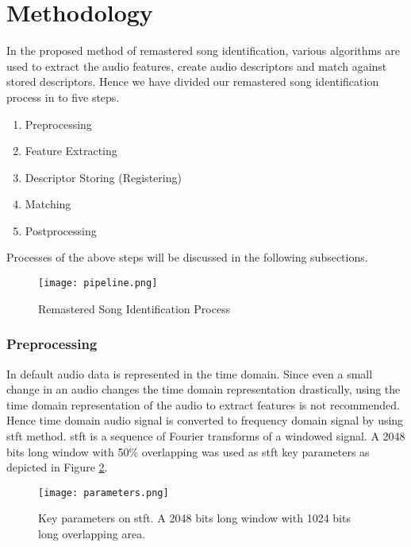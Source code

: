 \section{Methodology}

In the proposed method of remastered song identification, various algorithms are used to
extract the audio features, create audio descriptors and match against stored descriptors.
Hence we have divided our remastered song identification process in to five steps.

\begin{enumerate}
    \item Preprocessing
    \item Feature Extracting
    \item Descriptor Storing (Registering)
    \item Matching
    \item Postprocessing
  \end{enumerate}

Processes of the above steps will be discussed in the following subsections.

\begin{figure}[H]
    \centering
    \texttt{[image: pipeline.png]}
    \caption{Remastered Song Identification Process}
    \label{fig:pipeline}
\end{figure}


\subsubsection{Preprocessing}

In default audio data is represented in the time domain. Since even a small change in an audio changes the time domain representation drastically,
using the time domain representation of the audio to extract features is not recommended. Hence time domain audio signal is converted to
frequency domain signal by using \ac{stft} method. \ac{stft} is a sequence of Fourier transforms of a windowed signal\cite{Kehtarnavaz2008}.
A 2048 bits long window with 50\% overlapping was used as \ac{stft} key parameters as depicted in Figure \ref{fig:parameters}.

\begin{figure}[H]
  \centering
  \texttt{[image: parameters.png]}
  \caption{Key parameters on \ac{stft}. A 2048 bits long window with 1024 bits long overlapping area.}
  \label{fig:parameters}
\end{figure}

